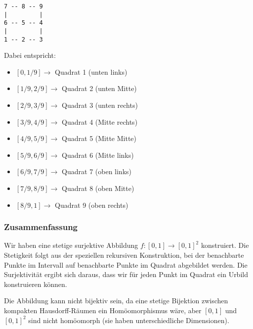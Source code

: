\documentclass{article}
\begin{document}
\begin{center}
\begin{verbatim}
7 -- 8 -- 9
|         |
6 -- 5 -- 4
|         |
1 -- 2 -- 3
\end{verbatim}
\end{center}

Dabei entspricht:
\begin{itemize}
\item $[0, 1/9] \to$ Quadrat 1 (unten links)
\item $[1/9, 2/9] \to$ Quadrat 2 (unten Mitte)
\item $[2/9, 3/9] \to$ Quadrat 3 (unten rechts)
\item $[3/9, 4/9] \to$ Quadrat 4 (Mitte rechts)
\item $[4/9, 5/9] \to$ Quadrat 5 (Mitte Mitte)
\item $[5/9, 6/9] \to$ Quadrat 6 (Mitte links)
\item $[6/9, 7/9] \to$ Quadrat 7 (oben links)
\item $[7/9, 8/9] \to$ Quadrat 8 (oben Mitte)
\item $[8/9, 1] \to$ Quadrat 9 (oben rechts)
\end{itemize}

\subsubsection*{Zusammenfassung}

Wir haben eine stetige surjektive Abbildung $f: [0,1] \to [0,1]^2$ konstruiert. Die Stetigkeit folgt aus der speziellen rekursiven Konstruktion, bei der benachbarte Punkte im Intervall auf benachbarte Punkte im Quadrat abgebildet werden. Die Surjektivität ergibt sich daraus, dass wir für jeden Punkt im Quadrat ein Urbild konstruieren können.

Die Abbildung kann nicht bijektiv sein, da eine stetige Bijektion zwischen kompakten Hausdorff-Räumen ein Homöomorphismus wäre, aber $[0,1]$ und $[0,1]^2$ sind nicht homöomorph (sie haben unterschiedliche Dimensionen).
\end{document}

